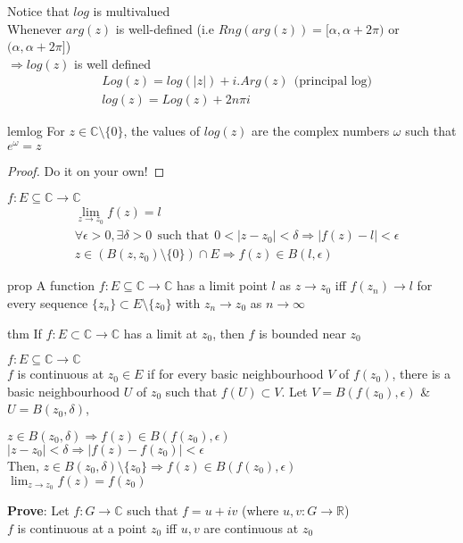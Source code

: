 Notice that $log$ is multivalued\\
Whenever $arg(z)$ is well-defined (i.e $Rng(arg(z))=[\alpha,\alpha+2\pi)$ or $(\alpha,\alpha+2\pi]$)\\$\Rightarrow log(z)$ is well defined
\begin{align}
&Log(z)=log(|z|)+i.Arg(z) \:\:\text{(principal log)} \nonumber\\
&log(z)=Log(z)+2n\pi i \nonumber
\end{align}
\begin{restatable}[]{lem}{log}\label{lem:log}
For $z\in \mathds{C}\setminus \{0\}$, the values of $log(z)$ are the complex numbers $\omega$ such that $e^{\omega}=z$
\end{restatable}
\begin{proof}
Do it on your own!
\end{proof}
\begin{defn}
$f: E\subseteq \mathds{C} \rightarrow \mathds{C}$
\begin{align}
&\lim_{z \to z_0} f(z)=l \nonumber\\
&\forall \epsilon>0,\exists \delta>0 \:\:\text{such that}\:\: 0<|z-z_0|<\delta \Rightarrow |f(z)-l|<\epsilon\nonumber\\
&z \in (B(z,z_0)\setminus\{0\})\cap E \Rightarrow f(z)\in B(l,\epsilon) \nonumber
\end{align}
\end{defn}
\begin{restatable}{prop}{}\label{}
 A function $f:E\subseteq  \mathds{C}\rightarrow \mathds{C}$ has a limit point $l$ as $z\rightarrow z_0$ iff $f(z_n)\rightarrow l$ for every sequence $\{z_n\}\subset E\setminus \{z_0\}$ with $z_n\rightarrow z_0$ as $n\rightarrow \infty$
\end{restatable} 
\begin{restatable}[]{thm}{}\label{}
If $f:E\subset \mathds{C} \rightarrow \mathds{C}$ has a limit at $z_0$, then $f$ is bounded near $z_0$
\end{restatable}
\begin{defn}
$f:E\subseteq \mathds{C}\rightarrow \mathds{C}$\\
$f$ is continuous at $z_0\in E$ if for every basic neighbourhood $V$ of $f(z_0)$, there is a basic neighbourhood $U$ of $z_0$ such that $f(U)\subset V$. Let $V=B(f(z_0),\epsilon)$ \& $U=B(z_0,\delta)$,
\begin{center}
$z\in B(z_0,\delta)\Rightarrow f(z)\in B(f(z_0),\epsilon)$\\
$|z-z_0|<\delta \Rightarrow |f(z)-f(z_0)|<\epsilon$\\
Then, $z\in B(z_0,\delta)\setminus \{z_0\} \Rightarrow f(z)\in B(f(z_0),\epsilon)$\\
$\lim_{z \to z_0} f(z)=f(z_0)$
\end{center}
\end{defn}
\textbf{Prove}: Let $f:G\rightarrow \mathds{C}$ such that $f=u+ iv$ (where $u,v:G\rightarrow \mathds{R}$)\\
$f$ is continuous at a point $z_0$ iff $u,v$ are continuous at $z_0$
